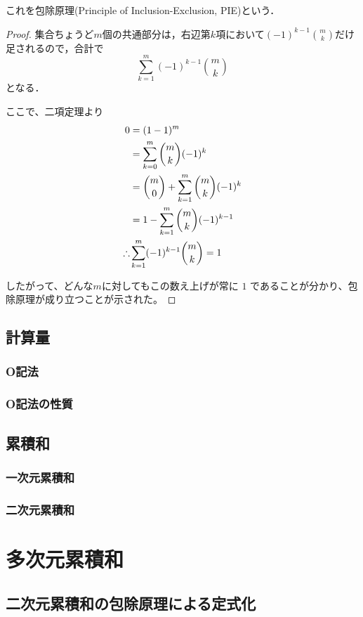\documentclass{jsreport}
\theoremstyle{plain} %
\theoremstyle{definition}
\begin{document}
これを包除原理(Principle of Inclusion-Exclusion, PIE)という．

\begin{proof}
集合ちょうど$m$個の共通部分は，右辺第$k$項において$(-1)^{k-1}\binom{m}{k}$だけ足されるので，合計で
\[
\sum_{k=1}^m (-1)^{k-1} \binom{m}{k}
\]
となる．

ここで、二項定理より
\begin{align}
    0 &= (1 - 1)^m  \notag \\
    &= \sum_{k=0}^m \binom{m}{k} (-1)^k  \notag \\
    &= \binom{m}{0} + \sum_{k=1}^m \binom{m}{k} (-1)^k  \notag \\
    &= 1 - \sum_{k=1}^m \binom{m}{k} (-1)^{k-1} \notag \\
    \therefore &\sum_{k=1}^m (-1)^{k-1} \binom{m}{k} = 1\notag
\end{align}

したがって、どんな$m$に対してもこの数え上げが常に $1$ であることが分かり、包除原理が成り立つことが示された。
\end{proof}

\section{計算量}
\subsection{O記法}
\subsection{O記法の性質}
\section{累積和}
\subsection{一次元累積和}
\subsection{二次元累積和}

\chapter{多次元累積和}
\section{二次元累積和の包除原理による定式化}
\end{document}
